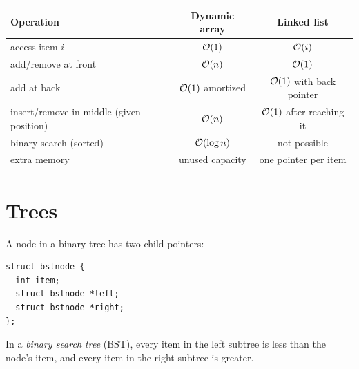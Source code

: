 \begin{center}
\begin{tabular}{lcc}
  \toprule
  Operation & Dynamic array & Linked list \\
  \midrule
  access item $i$ & $\mathcal{O}(1)$ & $\mathcal{O}(i)$ \\
  add/remove at front & $\mathcal{O}(n)$ & $\mathcal{O}(1)$ \\
  add at back & $\mathcal{O}(1)$ amortized & $\mathcal{O}(1)$ with back pointer \\
  insert/remove in middle (given position) & $\mathcal{O}(n)$ & $\mathcal{O}(1)$ after reaching it \\
  binary search (sorted) & $\mathcal{O}(\log n)$ & not possible \\
  extra memory & unused capacity & one pointer per item \\
  \bottomrule
\end{tabular}
\end{center}

\section{Trees}

A node in a binary tree has two child pointers:
\begin{lstlisting}[style=c]
struct bstnode {
  int item;
  struct bstnode *left;
  struct bstnode *right;
};
\end{lstlisting}
In a \emph{binary search tree} (BST), every item in the left subtree is less than the node's item,
and every item in the right subtree is greater.

\begin{center}
\end{center}

